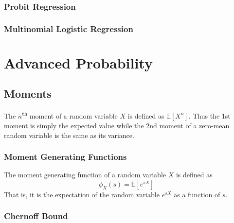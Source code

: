 \documentclass[11pt]{report} %
\begin{document}
\subsection{Probit Regression}

\subsection{Multinomial Logistic Regression}

\chapter{Advanced Probability}

\section{Moments}

The $n$\textsuperscript{th} moment of a random variable $X$ is defined as $\mathbb{E}\left[X^{n}\right]$. Thus the 1st moment is simply the expected value while the 2nd moment of a zero-mean random variable is the same as its variance.

\subsection{Moment Generating Functions}

The moment generating function of a random variable $X$ is defined as
\begin{equation}
\phi_{X}\left(s\right) =\mathbb{E}\left[e^{sX}\right]
\end{equation}
That is, it is the expectation of the random variable $e^{sX}$ as a function of $s$.

\subsection{Chernoff Bound}
\end{document}
